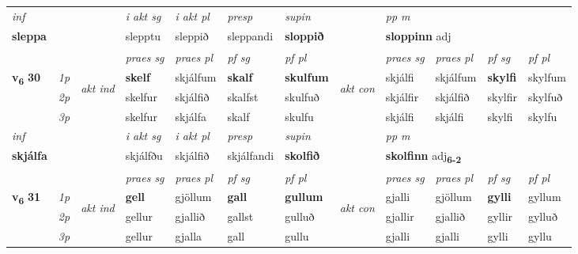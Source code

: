 \begin{longtable}[l]{X>{\footnotesize\itshape}llXXXXlXXXX}
   {\textit{inf}} & &  & \textit{i akt sg} & \textit{i akt pl}   & \textit{presp} & \textit{supin}  && \textit{pp m} \\*
  {\textbf{sleppa}} & && slepptu  & sleppið   & sleppandi &  \textbf{sloppið}  && \multicolumn{2}{l}{\textbf{sloppinn} adj\textbf{\textsubscript{}}} \\*

\midrule

 & &   & \textit{praes sg}  & \textit{praes pl}    & \textit{ pf sg} & \textit{pf pl} & & \textit{praes sg}  & \textit{praes pl}    & \textit{pf sg} & \textit{pf pl }  \\ \cmidrule{4-7} \cmidrule{9-12}
 \multirow{2}{*}{{{\textbf{v{\textsubscript{6}}} \Large{\textbf{30}}}}}  & 1p & \multirow{3}{*}{\begin{turn}{90}\textit{akt ind}\end{turn}} & \textbf{skelf} & skjálfum & \textbf{skalf} & \textbf{skulfum} & \multirow{3}{*}{\begin{turn}{90}\textit{akt con}\end{turn}} &skjálfi & skjálfum & \textbf{skylfi} & skylfum\\*
 & 2p &  &  skelfur  & skjálfið & skalfst & skulfuð & & skjálfir & skjálfið & skylfir & skylfuð \\*
 & 3p &  & skelfur & skjálfa & skalf & skulfu & & skjálfi & skjálfi& skylfi & skylfu \\*
\cmidrule{4-7} \cmidrule{9-12}

   {\textit{inf}} & &  & \textit{i akt sg} & \textit{i akt pl}   & \textit{presp} & \textit{supin}  && \textit{pp m} \\*
  {\textbf{skjálfa}} & && skjálfðu  & skjálfið   & skjálfandi &  \textbf{skolfið}  && \multicolumn{2}{l}{\textbf{skolfinn} adj\textbf{\textsubscript{6-2}}} \\*

\midrule

 & &   & \textit{praes sg}  & \textit{praes pl}    & \textit{ pf sg} & \textit{pf pl} & & \textit{praes sg}  & \textit{praes pl}    & \textit{pf sg} & \textit{pf pl }  \\ \cmidrule{4-7} \cmidrule{9-12}
 \multirow{2}{*}{{{\textbf{v{\textsubscript{6}}} \Large{\textbf{31}}}}}  & 1p & \multirow{3}{*}{\begin{turn}{90}\textit{akt ind}\end{turn}} & \textbf{gell} & gjöllum & \textbf{gall} & \textbf{gullum} & \multirow{3}{*}{\begin{turn}{90}\textit{akt con}\end{turn}} &gjalli & gjöllum & \textbf{gylli} & gyllum\\*
 & 2p &  &  gellur  & gjallið & gallst & gulluð & & gjallir & gjallið & gyllir & gylluð \\*
 & 3p &  & gellur & gjalla & gall & gullu & & gjalli & gjalli& gylli & gyllu \\*
\cmidrule{4-7} \cmidrule{9-12}


\end{longtable}
